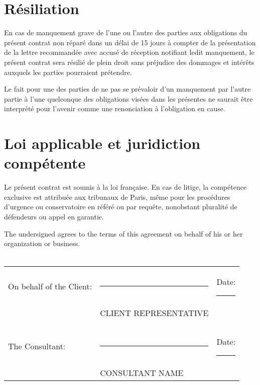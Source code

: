 \documentclass[11pt]{article}
\begin{document}
\section{Résiliation}
En cas de manquement grave de l’une ou l’autre des parties aux obligations du présent contrat non réparé dans un délai de 15 jours à compter de la présentation de la lettre recommandée avec accusé de réception notifiant ledit manquement, le présent contrat sera résilié de plein droit sans préjudice des dommages et intérêts auxquels les parties pourraient prétendre.

Le fait pour une des parties de ne pas se prévaloir d’un manquement par l’autre partie à l’une quelconque des obligations visées dans les présentes ne saurait être interprété pour l’avenir comme une renonciation à l’obligation en cause.

\section{Loi applicable et juridiction compétente}
Le présent contrat est soumis à la loi française. En cas de litige, la compétence exclusive est attribuée aux tribunaux de Paris, même pour les procédures d’urgence ou conservatoire en référé ou par requête, nonobstant pluralité de défendeurs ou appel en garantie.


\vspace{1cm}

\noindent The undersigned agrees to the terms of this agreement on behalf of his or
her organization or business.\\\\

\noindent \begin{tabular}{l l l}
On behalf of the Client: & \rule{6cm}{.2pt} & Date: \rule{2.4cm}{.2pt}\\
                         & CLIENT REPRESENTATIVE      & \\\\\\
The Consultant:          & \rule{6cm}{.2pt} & Date: \rule{2.4cm}{.2pt}\\
                         & CONSULTANT NAME      & \\
\end{tabular}
\end{document}
